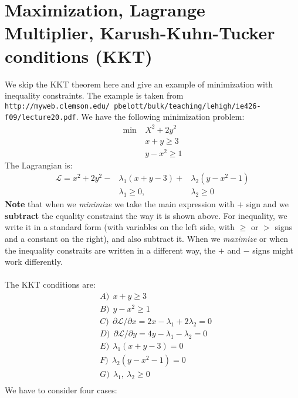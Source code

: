 \documentclass[]{article}
\begin{document}
\section{Maximization, Lagrange Multiplier, Karush-Kuhn-Tucker conditions (KKT)}
We skip the KKT theorem here and give an example of minimization with inequality constraints. The example is taken from {\texttt{http://myweb.clemson.edu/~pbelott/bulk/teaching/lehigh/ie426-f09/lecture20.pdf}}. We have the following minimization problem:
$$
\begin{aligned}
	\min~&X^2 + 2y^2\\
	  &x+y\geq 3\\
	  &y-x^2\geq 1
\end{aligned}
$$
The Lagrangian is:
$$
\begin{aligned}
	 \mathcal{L} = x^2 + 2y^2 - &\lambda_1(x+y - 3) + &\lambda_2(y-x^2- 1)\\
	 &\lambda_1 \geq 0,&\lambda_2 \geq 0
\end{aligned}
$$
{\scriptsize{\textbf{Note} that when we \emph{minimize} we take the main expression with $+$ sign and we \textbf{subtract} the equality constraint the way it is shown above. For inequality, we write it in a standard form (with variables on the left side, with $\geq$ or $>$ signs and a constant on the right), and also subtract it. When we \emph{maximize} or when the inequality constraits are written in a different way, the $+$ and $-$ signs might work differently.\\
}}~ \\
The KKT conditions are:
$$
\begin{aligned}
	&A)~~x+y\geq 3\\
	&B)~~y-x^2\geq 1\\
	&C)~~\partial\mathcal{L}/\partial{x}=2x - \lambda_1 + 2\lambda_2=0\\
	&D)~~\partial\mathcal{L}/\partial{y}=4y - \lambda_1 - \lambda_2=0\\
	&E)~~\lambda_1(x+y -3) = 0\\
	&F)~~\lambda_2(y-x^2 - 1)=0\\
	&G)~~\lambda_1,~\lambda_2\geq0\\
\end{aligned}
$$
We have to consider four cases:
\end{document}
